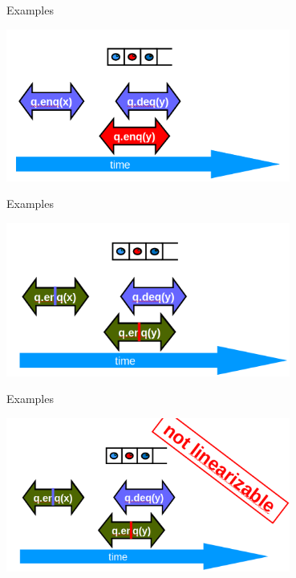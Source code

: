 \begin{frame}{Examples}
\begin{center} \includegraphics[width=0.7\textwidth]{./pics/linear/68.png} \end{center}
\end{frame}

\begin{frame}{Examples}
\begin{center} \includegraphics[width=0.7\textwidth]{./pics/linear/69.png} \end{center}
\end{frame}

\begin{frame}{Examples}
\begin{center} \includegraphics[width=0.7\textwidth]{./pics/linear/70.png} \end{center}
\end{frame}

